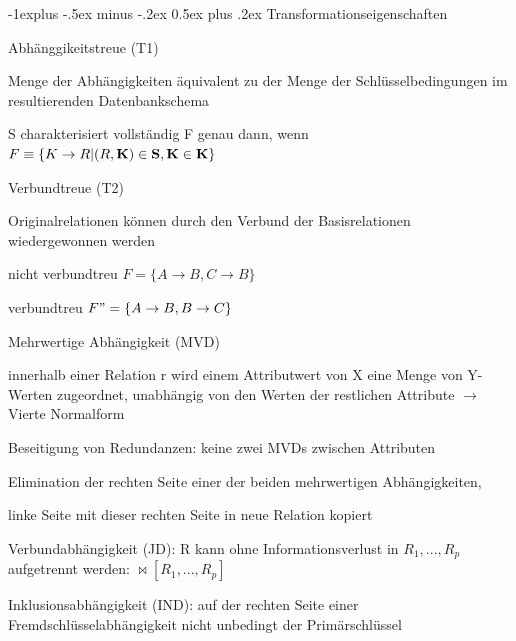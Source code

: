 \documentclass[a4paper]{article}
\makeatletter
\renewcommand{\subsection}{\@startsection{subsection}{2}{0mm}%
                                {-1explus -.5ex minus -.2ex}%
                                {0.5ex plus .2ex}%
                                {\normalfont\normalsize\bfseries}}
\makeatother
\begin{document}
\begin{multicols}{3}
    \subsection{Transformationseigenschaften}
    \begin{itemize*}
        \item Abhänggikeitstreue (T1)
        \begin{itemize*}
            \item Menge der Abhängigkeiten äquivalent zu der Menge der Schlüsselbedingungen im resultierenden Datenbankschema
            \item S charakterisiert vollständig F genau dann, wenn $F\equiv \{K\rightarrow R | (R,\bf{K})\in S, K\in\bf{K}\}$
        \end{itemize*}
        \item Verbundtreue (T2)
        \begin{itemize*}
            \item Originalrelationen können durch den Verbund der Basisrelationen wiedergewonnen werden
            \item nicht verbundtreu $F = \{A \rightarrow B, C \rightarrow B\}$
            \item verbundtreu $F" = \{A \rightarrow B, B \rightarrow C\}$
        \end{itemize*}
        \item Mehrwertige Abhängigkeit (MVD)
        \begin{itemize*}
            \item innerhalb einer Relation r wird einem Attributwert von X eine Menge von Y-Werten zugeordnet, unabhängig von den Werten der restlichen Attribute $\rightarrow$ Vierte Normalform
            \item Beseitigung von Redundanzen: keine zwei MVDs zwischen Attributen
            \item Elimination der rechten Seite einer der beiden mehrwertigen Abhängigkeiten,
            \item linke Seite mit dieser rechten Seite in neue Relation kopiert
        \end{itemize*}
        \item Verbundabhängigkeit (JD): R kann ohne Informationsverlust in $R_1,..., R_p$ aufgetrennt werden: $\bowtie [R_1,..., R_p]$
        \item Inklusionsabhängigkeit (IND): auf der rechten Seite einer Fremdschlüsselabhängigkeit nicht unbedingt der Primärschlüssel
    \end{itemize*}


\end{multicols}
\end{document}
